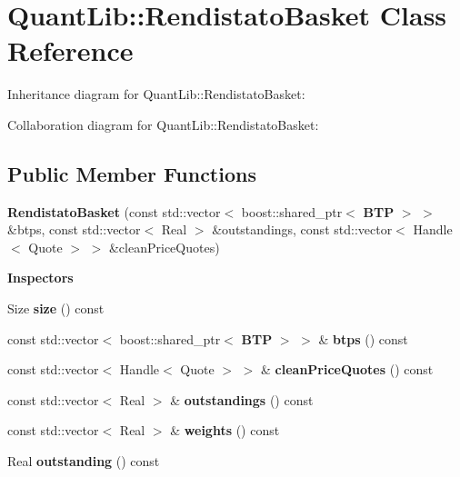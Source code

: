 \section{Quant\+Lib\+:\+:Rendistato\+Basket Class Reference}
\label{class_quant_lib_1_1_rendistato_basket}


Inheritance diagram for Quant\+Lib\+:\+:Rendistato\+Basket\+:


Collaboration diagram for Quant\+Lib\+:\+:Rendistato\+Basket\+:
\subsection*{Public Member Functions}
\begin{DoxyCompactItemize}
\item 
{\bfseries Rendistato\+Basket} (const std\+::vector$<$ boost\+::shared\+\_\+ptr$<$ {\bf B\+TP} $>$ $>$ \&btps, const std\+::vector$<$ Real $>$ \&outstandings, const std\+::vector$<$ Handle$<$ Quote $>$ $>$ \&clean\+Price\+Quotes)\label{class_quant_lib_1_1_rendistato_basket_a29865221e49dded778e1e3b3b430586c}

\end{DoxyCompactItemize}
\begin{Indent}{\bf Inspectors}\par
\begin{DoxyCompactItemize}
\item 
Size {\bfseries size} () const \label{class_quant_lib_1_1_rendistato_basket_a58ca7c23857fbbb01dd82aa1c8fcc995}

\item 
const std\+::vector$<$ boost\+::shared\+\_\+ptr$<$ {\bf B\+TP} $>$ $>$ \& {\bfseries btps} () const \label{class_quant_lib_1_1_rendistato_basket_a65477b28abc3f50a3b6d9bfd45678666}

\item 
const std\+::vector$<$ Handle$<$ Quote $>$ $>$ \& {\bfseries clean\+Price\+Quotes} () const \label{class_quant_lib_1_1_rendistato_basket_a87d7b7a6593a047a5d8ae4e3df2e06ab}

\item 
const std\+::vector$<$ Real $>$ \& {\bfseries outstandings} () const \label{class_quant_lib_1_1_rendistato_basket_a56df7764b8dca0dd7d71c7b8c3c0de34}

\item 
const std\+::vector$<$ Real $>$ \& {\bfseries weights} () const \label{class_quant_lib_1_1_rendistato_basket_a7217a69eae65cbd0160831beaa75d966}

\item 
Real {\bfseries outstanding} () const \label{class_quant_lib_1_1_rendistato_basket_a9fda917fb82aa6e5f60b98c4c651382e}

\end{DoxyCompactItemize}
\end{Indent}

